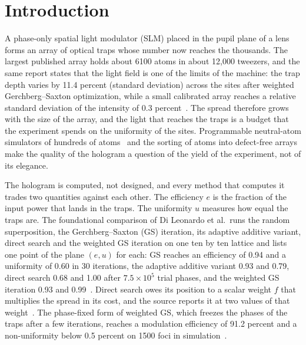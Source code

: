 \section{Introduction}\label{sec:intro}

A phase-only spatial light modulator (SLM) placed in the pupil plane of a lens forms an array of optical traps whose number now reaches the thousands. The largest
published array holds about 6100 atoms in about 12,000 tweezers, and the same report states that the light field is one of the limits of
the machine: the trap depth varies by 11.4 percent (standard deviation) across the sites after weighted Gerchberg--Saxton optimization, while a small calibrated array reaches a relative
standard deviation of the intensity of 0.3 percent~\cite{manetsch,chew}. The spread therefore grows with the size of the array, and the light that reaches the traps is a budget that the
experiment spends on the uniformity of the sites. Programmable neutral-atom simulators of hundreds of atoms~\cite{ebadi} and the sorting of atoms into defect-free arrays make the quality of the hologram a question of the yield of the
experiment, not of its elegance.

The hologram is computed, not designed, and every method that computes it trades two quantities against each other. The efficiency $e$ is the fraction of the input power that lands in the traps. The uniformity $u$ measures how equal the traps are.
The foundational comparison of Di Leonardo et al.\ runs the random superposition, the Gerchberg--Saxton (GS) iteration, its adaptive additive variant, direct search and the weighted GS iteration on one ten by ten lattice and lists one
point of the plane $(e,u)$ for each: GS reaches an efficiency of 0.94 and a uniformity of 0.60 in 30 iterations, the adaptive additive variant 0.93 and 0.79, direct search 0.68 and 1.00 after $7.5\times10^{5}$ trial phases, and the weighted GS iteration 0.93 and 0.99~\cite{dileonardo}.
Direct search owes its position to a scalar weight $f$ that multiplies the spread in its cost, and the source reports it at two values of that weight~\cite{dileonardo,polin}. The phase-fixed form of weighted GS, which freezes the
phases of the traps after a few iterations, reaches a modulation efficiency of 91.2 percent and a non-uniformity below 0.5 percent on 1500 foci in simulation~\cite{kim2019}.

